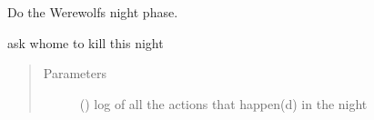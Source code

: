 \documentclass[letterpaper,10pt,english]{sphinxmanual}
\begin{document}
\begin{fulllineitems}
\begin{fulllineitems}
\begin{quote}
\begin{description}
\end{description}\end{quote}

\end{fulllineitems}



\begin{fulllineitems}
\end{fulllineitems}



\begin{fulllineitems}
\end{fulllineitems}



\begin{fulllineitems}
Do the Werewolfs night phase.

ask whome to kill this night
\begin{quote}\begin{description}
\item[{Parameters}] \leavevmode
{} ({\hyperref[\detokenize{chatwolf:chatwolf.nightactions.Nightactions}]{}}) \textendash{} log of all the actions that happen(d) in the night

\end{description}\end{quote}

\end{fulllineitems}


\end{fulllineitems}
\end{document}

